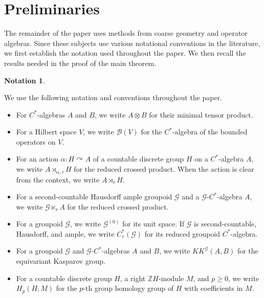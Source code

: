 \documentclass[pdflatex,sn-mathphys-num]{sn-jnl}%
\theoremstyle{plain}
\theoremstyle{remark}
\theoremstyle{definition}
\newtheorem{notation}[theorem]{Notation}
\numberwithin{equation}{section}
\begin{document}
\section{Preliminaries}
\label{sec:preliminaries}

The remainder of the paper uses methods from coarse geometry and operator algebras. Since these subjects use various notational conventions in the literature, we first establish the notation used throughout the paper. We then recall the results needed in the proof of the main theorem.

\begin{notation}
\label{def:standing-notation}

We use the following notation and conventions throughout the paper.

\begin{itemize}
    \item For \( C^* \)-algebras \( A \) and \( B \), we write \( A\otimes B \) for their minimal tensor product.

    \item For a Hilbert space \( V \), we write \( \mathcal B(V) \) for the \( C^* \)-algebra of the bounded operators on \( V \).

    \item For an action \( \alpha\colon H\curvearrowright A \) of a countable discrete group \( H \) on a \( C^* \)-algebra \( A \), we write \( A\rtimes_{\alpha,r}H \) for the reduced crossed product. When the action is clear from the context, we write \( A\rtimes_r H \).

    \item For a second-countable Hausdorff ample groupoid \( \mathcal G \) and a \( \mathcal G \)-\( C^* \)-algebra \( A \), we write \( \mathcal G\ltimes_r A \) for the reduced crossed product.

    \item For a groupoid \( \mathcal G \), we write \( \mathcal G^{(0)} \) for its unit space. If \( \mathcal G \) is second-countable, Hausdorff, and ample, we write \( C_r^*(\mathcal G) \) for its reduced groupoid \( C^* \)-algebra.

    \item For a groupoid \( \mathcal G \) and \( \mathcal G \)-\( C^* \)-algebras \( A \) and \( B \), we write \( KK^{\mathcal G}(A,B) \) for the equivariant Kasparov group.

    \item For a countable discrete group \( H \), a right \( \mathbb Z H \)-module \( M \), and \( p\geq 0 \), we write \( H_p(H;M) \) for the \( p \)-th group homology group of \( H \) with coefficients in \( M \).


\end{itemize}
\end{notation}
\end{document}
